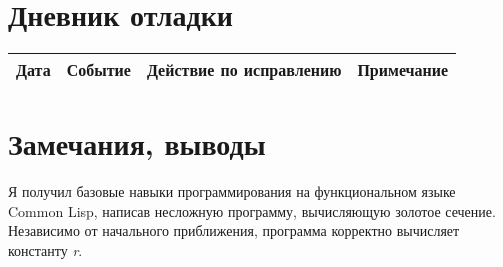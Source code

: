 \documentclass[a4paper, 12pt]{article}
\begin{document}
\section{Дневник отладки}
\begin{tabular}{|c|c|c|c|}
\hline
Дата & Событие & Действие по исправлению & Примечание \\
\hline
\end{tabular}


\section{Замечания, выводы}
Я получил базовые навыки программирования на функциональном языке Common Lisp, написав несложную программу, вычисляющую золотое сечение. Независимо от начального приближения, программа корректно вычисляет константу \textit{r}.
\end{document}
